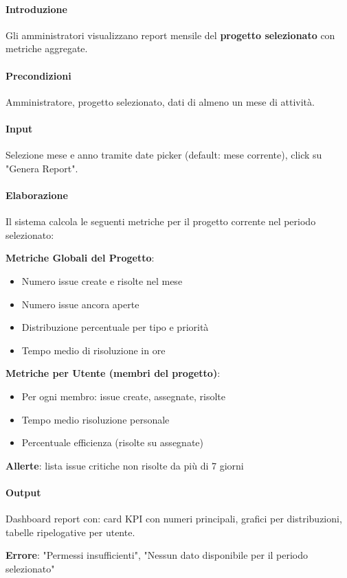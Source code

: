\begin{reqbox}[title=REQ-FUN-26: Visualizza Report Mensile (solo Admin)]
\label{subsubsec:req-visualizza-report-mensile}

\paragraph{Introduzione}
Gli amministratori visualizzano report mensile del \textbf{progetto selezionato} con metriche aggregate.

\paragraph{Precondizioni}
Amministratore, progetto selezionato, dati di almeno un mese di attività.

\paragraph{Input}
Selezione mese e anno tramite date picker (default: mese corrente), click su "Genera Report".

\paragraph{Elaborazione}
Il sistema calcola le seguenti metriche per il progetto corrente nel periodo selezionato:

\textbf{Metriche Globali del Progetto}:
\begin{itemize}[leftmargin=1.1em]
\item Numero issue create e risolte nel mese
\item Numero issue ancora aperte
\item Distribuzione percentuale per tipo e priorità
\item Tempo medio di risoluzione in ore
\end{itemize}

\textbf{Metriche per Utente (membri del progetto)}:
\begin{itemize}[leftmargin=1.1em]
\item Per ogni membro: issue create, assegnate, risolte
\item Tempo medio risoluzione personale
\item Percentuale efficienza (risolte su assegnate)
\end{itemize}

\textbf{Allerte}: lista issue critiche non risolte da più di 7 giorni

\paragraph{Output}
Dashboard report con: card KPI con numeri principali, grafici per distribuzioni, tabelle ripelogative per utente.

\textbf{Errore}: "Permessi insufficienti", "Nessun dato disponibile per il periodo selezionato"

\end{reqbox}

\newpage
